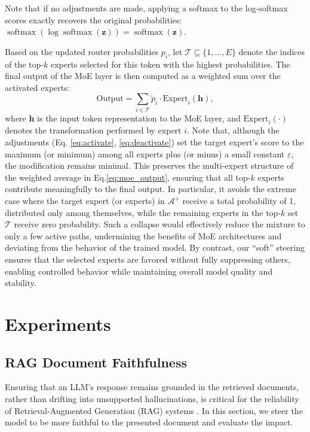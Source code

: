 \documentclass{article} %
\begin{document}
Note that if no adjustments are made, applying a softmax to the log‑softmax scores exactly recovers the original probabilities:
$
\operatorname{softmax}(\log \operatorname{softmax}(\mathbf z)) = \operatorname{softmax}(\mathbf z).
$

Based on the updated router probabilities $p_i$, let $\mathcal{T} \subseteq \{1, \dots, E\}$ denote the indices of the top‑$k$ experts selected for this token with the highest probabilities. The final output of the MoE layer is then computed as a weighted sum over the activated experts:
\begin{equation}
\text{Output} = \sum_{i \in \mathcal{T}} \tilde{p}_i \cdot \text{Expert}_i(\mathbf h),
\label{eq:moe_output}
\end{equation}
where $\mathbf h$ is the input token representation to the MoE layer, and $\text{Expert}_i(\cdot)$ denotes the transformation performed by expert $i$.
Note that, although the adjustments (Eq. \ref{eq:activate}, \ref{eq:deactivate}) set the target expert's score to the maximum (or minimum) among all experts plus (or minus) a small constant $\varepsilon$, the modification remains minimal. This preserves the multi-expert structure of the weighted average in Eq.\ref{eq:moe_output}, ensuring that all top-$k$ experts contribute meaningfully to the final output. 
In particular, it avoids the extreme case where the target expert (or experts) in $\mathcal{A}^{+}$ receive a total probability of 1, distributed only among themselves, while the remaining experts in the top-$k$ set $\mathcal{T}$ receive zero probability. Such a collapse would effectively reduce the mixture to only a few active paths, undermining the benefits of MoE architectures and deviating from the behavior of the trained model.
By contrast, our “soft” steering ensures that the selected experts are favored without fully suppressing others, enabling controlled behavior while maintaining overall model quality and stability.


\section{Experiments}


\subsection{RAG Document Faithfulness}

Ensuring that an LLM’s response remains grounded in the retrieved documents, rather than drifting into unsupported hallucinations, is critical for the reliability of Retrieval-Augmented Generation (RAG) systems \citep{niu-etal-2024-ragtruth, FaithEval2025}. In this section, we steer the model to be more faithful to the presented document and evaluate the impact.
\end{document}
